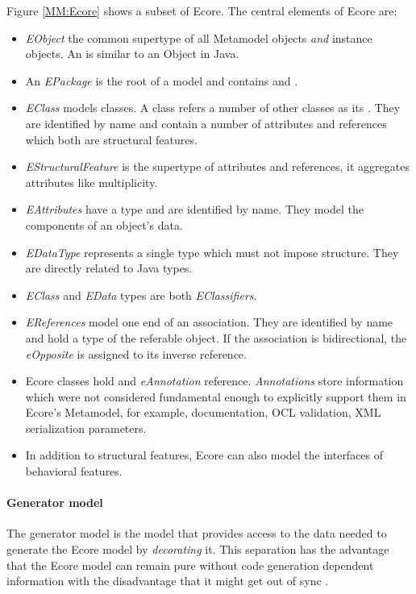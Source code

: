 Figure \ref{MM:Ecore} shows a subset of Ecore. The central elements of Ecore are:\\
\begin{itemize}
	\item \emph{EObject} the common supertype of all Metamodel objects \emph{and} instance objects. An  is similar to an Object in Java.
	\item An \emph{EPackage} is the root of a model and contains  and .
	\item \emph{EClass} models classes. A class refers a number of other classes as its . They are identified by name and contain a number of attributes and references which both are structural features.
	\item \emph{EStructuralFeature} is the supertype of attributes and references, it aggregates attributes like multiplicity.
	\item \emph{EAttributes} have a type and are identified by name. They model the components of an object's data.
	\item \emph{EDataType} represents a single type which must not impose structure. They are directly related to Java types.
	\item \emph{EClass} and \emph{EData} types are both \emph{EClassifiers}.
	\item \emph{EReferences} model one end of an association. They are identified by name and hold a type of the referable object. If the association is bidirectional, the \emph{eOpposite} is assigned to its inverse reference. \cite{EMF2nd}
	\item Ecore classes hold and \emph{eAnnotation} reference. \emph{Annotations} store information which were not considered fundamental enough to explicitly support them in Ecore's Metamodel, for example, documentation, OCL validation, XML serialization parameters. \cite{EMP}
	\item In addition to structural features, Ecore can also model the interfaces of behavioral features.
\end{itemize}

\paragraph{Generator model}
The generator model is the model that provides access to the data needed to generate the Ecore model by \emph{decorating} it. This separation has the advantage that the Ecore model can remain pure without code generation dependent information with the disadvantage that it might get out of sync \cite{EMF2nd}.



